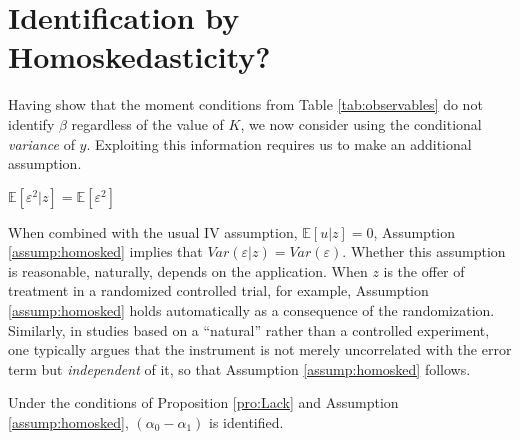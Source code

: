 \section{Identification by Homoskedasticity?}
Having show that the moment conditions from Table \ref{tab:observables} do not identify $\beta$ regardless of the value of $K$, we now consider using the conditional \emph{variance} of $y$.
Exploiting this information requires us to make an additional assumption.
\begin{assump}[Homoskedasticity]
  $\mathbb{E}[\varepsilon^2|z]=\mathbb{E}[\varepsilon^2]$
  \label{assump:homosked}
\end{assump}
When combined with the usual IV assumption, $\mathbb{E}[u|z]=0$, Assumption \ref{assump:homosked} implies that $Var(\varepsilon|z) = Var(\varepsilon)$.
Whether this assumption is reasonable, naturally, depends on the application.
When $z$ is the offer of treatment in a randomized controlled trial, for example, Assumption \ref{assump:homosked} holds automatically as a consequence of the randomization.
Similarly, in studies based on a ``natural'' rather than a controlled experiment, one typically argues that the instrument is not merely uncorrelated with the error term but \emph{independent} of it, so that Assumption \ref{assump:homosked} follows.
\begin{pro}
  \label{pro:homosked}
  Under the conditions of Proposition \ref{pro:Lack} and Assumption \ref{assump:homosked}, $(\alpha_0 - \alpha_1)$ is identified. 
\end{pro}
